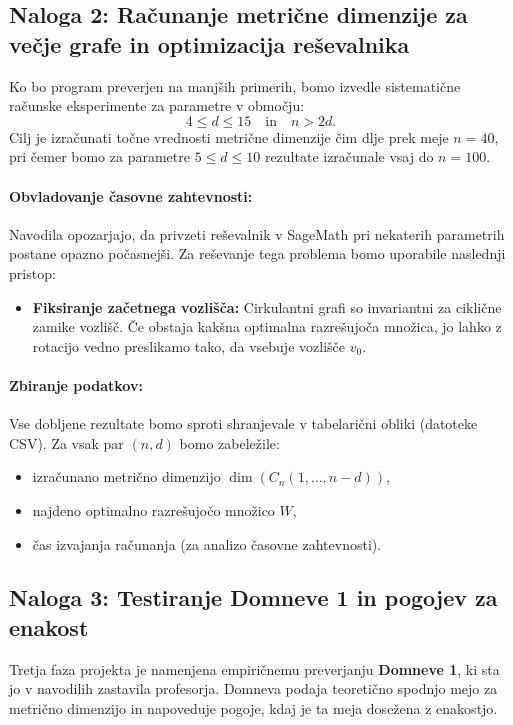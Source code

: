 \documentclass[a4paper,12pt]{article}
\theoremstyle{definition}
\begin{document}
\subsection{Naloga 2: Računanje metrične dimenzije za večje grafe in optimizacija reševalnika}

Ko bo program preverjen na manjših primerih, bomo izvedle sistematične računske eksperimente za parametre v območju:
\[
4 \leq d \leq 15 \quad \text{in} \quad n > 2d.
\]
Cilj je izračunati točne vrednosti metrične dimenzije čim dlje prek meje $n = 40$, pri čemer bomo za parametre 
$5 \leq d \leq 10$ rezultate izračunale vsaj do $n = 100$.

\paragraph{Obvladovanje časovne zahtevnosti:}
Navodila opozarjajo, da privzeti reševalnik v SageMath pri nekaterih parametrih postane opazno počasnejši. Za reševanje 
tega problema bomo uporabile naslednji pristop:
\begin{itemize}
    \item \textbf{Fiksiranje začetnega vozlišča:} Cirkulantni grafi so invariantni za ciklične zamike vozlišč. 
    Če obstaja kakšna optimalna razrešujoča množica, jo lahko z rotacijo vedno preslikamo tako, da vsebuje vozlišče 
    $v_0$.
\end{itemize}

\paragraph{Zbiranje podatkov:}
Vse dobljene rezultate bomo sproti shranjevale v tabelarični obliki (datoteke CSV). Za vsak par $(n, d)$ bomo zabeležile:
\begin{itemize}
    \item izračunano metrično dimenzijo $\operatorname{dim}(C_n(1, \dots, n-d))$,
    \item najdeno optimalno razrešujočo množico $W$,
    \item čas izvajanja računanja (za analizo časovne zahtevnosti).
\end{itemize}

\subsection{Naloga 3: Testiranje Domneve 1 in pogojev za enakost}

Tretja faza projekta je namenjena empiričnemu preverjanju \textbf{Domneve 1}, ki sta jo v navodilih zastavila profesorja. 
Domneva podaja teoretično spodnjo mejo za metrično dimenzijo in napoveduje pogoje, kdaj je ta meja dosežena z enakostjo.
\end{document}
